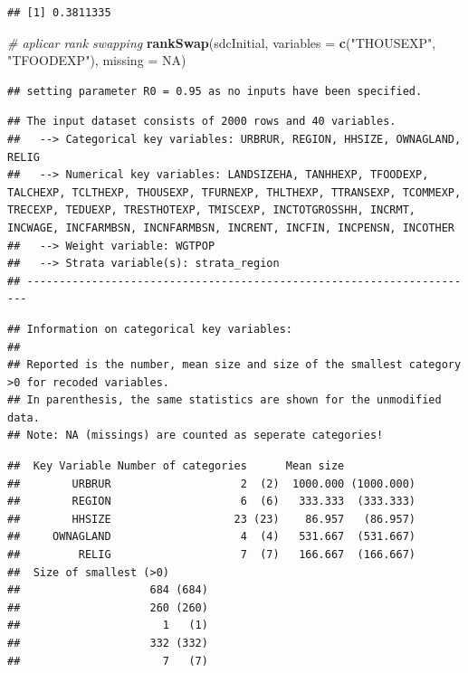 \documentclass[]{book}
\newenvironment{Shaded}{\begin{snugshade}}{\end{snugshade}}
\newcommand{\CommentTok}[1]{\textcolor[rgb]{0.56,0.35,0.01}{\textit{#1}}}
\newcommand{\DataTypeTok}[1]{\textcolor[rgb]{0.13,0.29,0.53}{#1}}
\newcommand{\KeywordTok}[1]{\textcolor[rgb]{0.13,0.29,0.53}{\textbf{#1}}}
\newcommand{\NormalTok}[1]{#1}
\newcommand{\OtherTok}[1]{\textcolor[rgb]{0.56,0.35,0.01}{#1}}
\newcommand{\StringTok}[1]{\textcolor[rgb]{0.31,0.60,0.02}{#1}}
\theoremstyle{definition}
\theoremstyle{definition}
\theoremstyle{definition}
\theoremstyle{definition}
\theoremstyle{remark}
\begin{document}
\begin{verbatim}
## [1] 0.3811335
\end{verbatim}

\begin{Shaded}
\begin{Highlighting}[]
\CommentTok{# aplicar rank swapping}
\KeywordTok{rankSwap}\NormalTok{(sdcInitial, }\DataTypeTok{variables =} \KeywordTok{c}\NormalTok{(}\StringTok{"THOUSEXP"}\NormalTok{, }\StringTok{"TFOODEXP"}\NormalTok{), }\DataTypeTok{missing =} \OtherTok{NA}\NormalTok{) }
\end{Highlighting}
\end{Shaded}

\begin{verbatim}
## setting parameter R0 = 0.95 as no inputs have been specified.
\end{verbatim}

\begin{verbatim}
## The input dataset consists of 2000 rows and 40 variables.
##   --> Categorical key variables: URBRUR, REGION, HHSIZE, OWNAGLAND, RELIG
##   --> Numerical key variables: LANDSIZEHA, TANHHEXP, TFOODEXP, TALCHEXP, TCLTHEXP, THOUSEXP, TFURNEXP, THLTHEXP, TTRANSEXP, TCOMMEXP, TRECEXP, TEDUEXP, TRESTHOTEXP, TMISCEXP, INCTOTGROSSHH, INCRMT, INCWAGE, INCFARMBSN, INCNFARMBSN, INCRENT, INCFIN, INCPENSN, INCOTHER
##   --> Weight variable: WGTPOP
##   --> Strata variable(s): strata_region
## ----------------------------------------------------------------------
\end{verbatim}

\begin{verbatim}
## Information on categorical key variables:
## 
## Reported is the number, mean size and size of the smallest category >0 for recoded variables.
## In parenthesis, the same statistics are shown for the unmodified data.
## Note: NA (missings) are counted as seperate categories!
\end{verbatim}

\begin{verbatim}
##  Key Variable Number of categories      Mean size           
##        URBRUR                    2  (2)  1000.000 (1000.000)
##        REGION                    6  (6)   333.333  (333.333)
##        HHSIZE                   23 (23)    86.957   (86.957)
##     OWNAGLAND                    4  (4)   531.667  (531.667)
##         RELIG                    7  (7)   166.667  (166.667)
##  Size of smallest (>0)      
##                    684 (684)
##                    260 (260)
##                      1   (1)
##                    332 (332)
##                      7   (7)
\end{verbatim}
\end{document}
